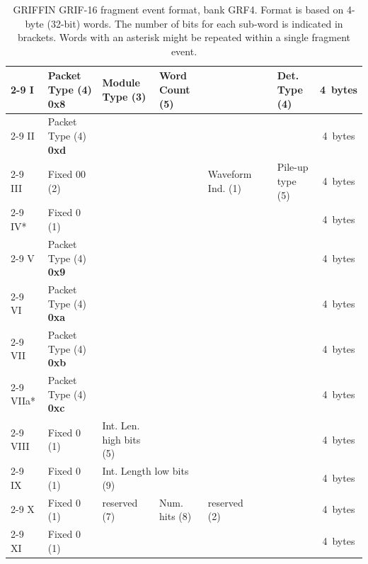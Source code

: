 \documentclass[letterpaper,12pt,notitlepage]{report}
\begin{document}
\begin{landscape}
\begin{table}
\caption{GRIFFIN GRIF-16 fragment event format, bank GRF4. Format is based on 4-byte (32-bit) words. The number of bits for each sub-word is indicated in brackets. Words with an asterisk might be repeated within a single fragment event.}
\begin{tabular*}{\textwidth}{p{0.9cm}|p{2.25cm}|p{2.2cm}|p{2.2cm}|p{2.2cm}|p{2.2cm}|p{2.2cm}|p{2.2cm}|p{2.2cm}|c}
\cline{2-9}
I& Packet Type (4) {\bf 0x8} & Module Type (3) & Word Count (5) & \multicolumn{4}{p{8.8cm}|}{\centering{Address (16)}} & Det. Type (4) & 4~bytes\\
\cline{2-9}
II & Packet Type (4) {\bf 0xd} & \multicolumn{7}{p{15.4cm}|}{\centering{Network Packet Counter Value (28)}} & 4~bytes\\
\cline{2-9}
III & Fixed 00 (2) & \multicolumn{3}{p{6.6cm}|}{\centering{Filter Patterns (14)}} & Waveform Ind. (1) & \multicolumn{2}{p{4.4cm}|}{\centering{reserved (10)}} & Pile-up type (5) & 4~bytes\\
\cline{2-9}
IV* & Fixed 0 (1) & \multicolumn{7}{p{15.4cm}|}{\centering{Filter Condition Counter Value (31)}} & 4~bytes\\
\cline{2-9}
V & Packet Type (4) {\bf 0x9} & \multicolumn{7}{p{15.4cm}|}{\centering{Channel Hit Detection Counter Value (28)}} & 4~bytes\\
\cline{2-9}
VI & Packet Type (4) {\bf 0xa} & \multicolumn{7}{p{15.4cm}|}{\centering{Time Stamp low bits (28)}} & 4~bytes\\
\cline{2-9}
VII & Packet Type (4) {\bf 0xb} & \multicolumn{3}{p{6.6cm}|}{\centering{Deadtime (14)}} & \multicolumn{4}{p{8.8cm}|}{\centering{Time Stamp high bits (14)}} & 4~bytes\\
\cline{2-9}
VIIa* & Packet Type (4) {\bf 0xc} & \multicolumn{7}{p{15.4cm}|}{\centering{Waveform Sample (28)}} & 4~bytes\\
\cline{2-9}
VIII & Fixed 0 (1) & Int. Len. high bits (5) & \multicolumn{6}{p{13.2cm}|}{\centering{Pulse Height (26)}} & 4~bytes\\
\cline{2-9}
IX & Fixed 0 (1) & \multicolumn{2}{p{4.4cm}|}{Int. Length low bits (9)} & \multicolumn{5}{p{11.0cm}|}{\centering{CFD (22)}} & 4~bytes\\
\cline{2-9}
X & Fixed 0 (1) & reserved (7) & \multicolumn{2}{p{4.4cm}|}{Num. hits (8)} & reserved (2) & \multicolumn{3}{p{6.6cm}|}{\centering{Int. Len. 2 (14)}} & 4~bytes\\
\cline{2-9}
XI & Fixed 0 (1) & \multicolumn{7}{p{15.4cm}|}{\centering{Pulse Height 2 (31)}} & 4~bytes\\

\end{tabular*}
\end{table}
\end{landscape}
\end{document}

